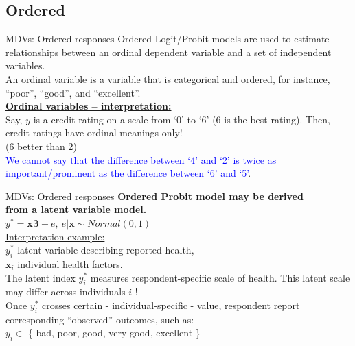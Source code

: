 \documentclass[usenames,dvipsnames]{beamer}
\begin{document}
\subsection{Ordered}
\begin{frame}{MDVs: Ordered responses}
Ordered Logit/Probit models are used to estimate relationships between an ordinal dependent variable and a set of independent variables. \\
\bigskip
An ordinal variable is a variable that is categorical and ordered, for instance, ``poor'', ``good'', and ``excellent''. \\
\bigskip
\underline{\textbf{Ordinal variables – interpretation:}} \\
Say, $y$ is a credit rating on a scale from `0' to `6' (6 is the best rating). Then, credit ratings have ordinal meanings only! \\(6 better than 2)  \\
\smallskip
\textcolor{Blue}{We cannot say that the difference between `4' and `2' is twice as important/prominent as the difference between `6' and `5'}.
\end{frame}
\begin{frame}{MDVs: Ordered responses}
\textbf{Ordered Probit model may be derived \\from a latent variable model.} \\
\bigskip
$y^{\ast} = \bm{x \beta} + e, \ e|\bm{x} \sim \textit{Normal}(0,1)$ \\
\bigskip
\underline{Interpretation example:} \\
\medskip
$y_i^{\ast}$ latent variable describing reported health, \\
\smallskip
$\bm{x}_i$ individual health factors.\\
\bigskip
The latent index $y_i^{\ast}$  measures respondent-specific scale of health. This latent scale may differ across individuals $i$ ! \\
\medskip
Once $y_i^{\ast}$ crosses certain - individual-specific - value, respondent report corresponding ``observed'' outcomes, such as:\\
$y_i \in$ \{ bad, poor,  good,  very good,  excellent \}
\end{frame}
\end{document}
